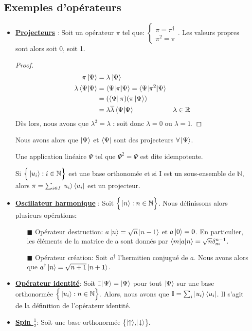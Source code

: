 \documentclass[../notesdecours.tex]{subfiles}
\begin{document}
\subsection{Exemples d'opérateurs}
\begin{itemize}
\item \underline{\textbf{Projecteurs}} : Soit un opérateur $\pi$ tel que: $\begin{cases} 
\pi = \pi^\dag\\
\pi^2 = \pi
\end{cases}$. Les valeurs propres sont alors soit 0, soit 1.
\begin{proof}
\begin{align*}
\pi\ket{\Psi} &= \lambda\ket{\Psi}\\
\lambda\braket{\Psi|\Psi} &= \braket{\Psi|\pi|\Psi} = \braket{\Psi|\pi^2|\Psi}\\
&= (\bra{\Psi}\pi)(\pi\ket{\Psi})\\
&= \lambda \overline{\lambda} \braket{\Psi|\Psi}		&\lambda\in\mathbb{R}\\
\end{align*}
Dès lors, nous avons que $\lambda^2 = \lambda$ : soit donc $\lambda = 0$ ou $\lambda = 1$.
\end{proof}

Nous avons alors que $\ket{\Psi}$ et $\bra{\Psi}$ sont des projecteurs $\forall\ket{\Psi}$.\\

\begin{remark}
Une application linéaire $\Psi$ tel que $\Psi^2 = \Psi$ est dite idempotente. \end{remark}

\begin{definition} Si $\Big\{\ket{u_i}: i\in\mathbb{N} \Big\}$ est une base orthonomée et si I est un sous-ensemble de $\mathbb{N}$, alors $\pi = \sum_{i\in I} \ket{u_i}\bra{u_i}$ est un projecteur. \end{definition}

\item \underline{\textbf{Oscillateur harmonique}} : Soit $\Big\{\ket{n}: n\in\mathbb{N} \Big\}$. Nous définissons alors plusieurs opérations:
	\begin{itemize}
	\item[$\blacksquare$] Opérateur destruction: $a\ket{n} = \sqrt{n}\ket{n-1}$ et $a\ket{0} = 0$. En particulier, les éléments de la matrice de a sont donnés par $\braket{m|a|n} = \sqrt{n}\delta_{m}^{n-1}$.
	\item[$\blacksquare$] Opérateur création: Soit $a^\dag$ l'hermitien conjugué de $a$. Nous avons alors que $a^\dag\ket{n} = \sqrt{n+1}\ket{n+1}$.
	\end{itemize}
\item \underline{\textbf{Opérateur identité}}: Soit $\mathbb{I}\ket{\Psi} = \ket{\Psi}$ pour tout $\ket{\Psi}$ sur une base orthonormée $\Big\{\ket{u_i}: n\in\mathbb{N} \Big\}$. Alors, nous avons que $\mathbb{I} = \sum_i \ket{u_i}\bra{u_i}$. Il s'agit de la définition de l'opérateur identité.
\item \underline{\textbf{Spin $\frac{1}{2}$}}: Soit une base orthonormée \bigg\{$\ket{\uparrow}$,$\ket{\downarrow}$\bigg\}.
\end{itemize}
\end{document}
